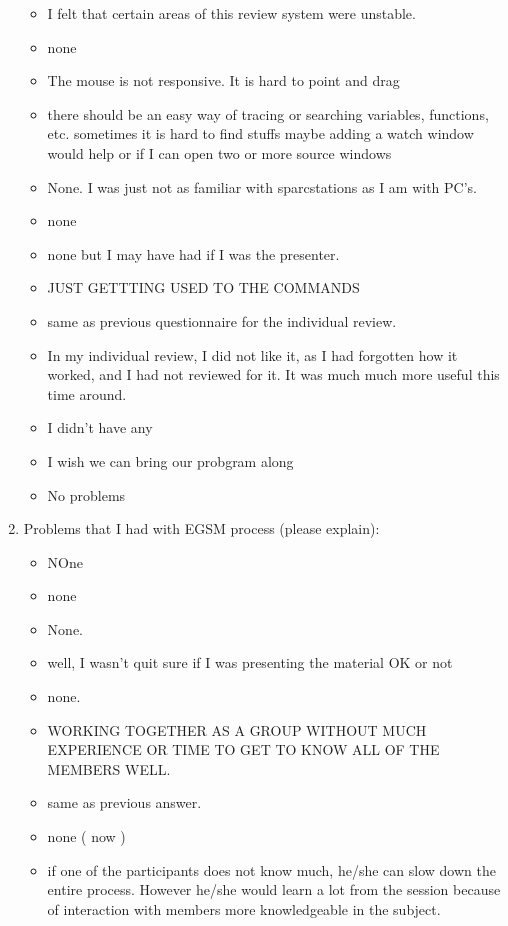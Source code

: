 \begin{enumerate}
\begin{itemize}
\item I felt that certain areas of this review system were unstable.
\item none
\item The mouse is not responsive.  It is hard to point and drag
\item there should be an easy way of tracing or searching variables,
functions, etc.
sometimes it is hard to find stuffs
maybe adding a watch window would help
or if I can open two or more source windows
\item None.  I was just not as familiar with sparcstations as I am with PC's.
\item none
\item none but I may have had if I was the presenter.

\item JUST GETTTING USED TO THE COMMANDS
\item same as previous questionnaire for the individual review.

\item In my individual review, I did not like it, as I had forgotten how it
worked, and I had not reviewed for it.  It was much much more useful
this time around.
\item I didn't have any
\item I wish we can bring our probgram along
\item No problems
\end{itemize}


\item Problems that I had with EGSM process (please explain): 
\begin{itemize}
\item NOne
\item none
\item None.
\item well, I wasn't quit sure if I was presenting the material OK or not
\item none.

\item WORKING TOGETHER AS A GROUP WITHOUT MUCH EXPERIENCE OR TIME TO GET TO
KNOW ALL OF THE MEMBERS WELL.

\item same as previous answer.

\item none ( now )
\item if one of the participants does not know much, he/she can slow down
the entire process.  However he/she would learn a lot from the session
because of interaction with members more knowledgeable in the subject.


\end{itemize}
\end{enumerate}
